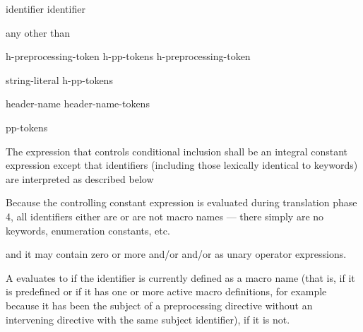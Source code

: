 %
\begin{bnf}
\br
     identifier\br
     identifier \terminal{)}
\end{bnf}

\begin{bnf}
\br
    \textnormal{any  other than \terminal{>}}
\end{bnf}

\begin{bnf}
\br
    h-preprocessing-token\br
    h-pp-tokens h-preprocessing-token
\end{bnf}

\begin{bnf}
\br
    string-literal\br
    \terminal{<} h-pp-tokens \terminal{>}
\end{bnf}

%
\begin{bnf}
\br
     \terminal{(} header-name \terminal{)}\br
     \terminal{(} header-name-tokens \terminal{)}
\end{bnf}

%
\begin{bnf}
\br
     pp-tokens \terminal{)}
\end{bnf}

\pnum
The expression that controls conditional inclusion
shall be an integral constant expression except that
identifiers
(including those lexically identical to keywords)
are interpreted as described below
\begin{footnote}
Because the controlling constant expression is evaluated
during translation phase 4,
all identifiers either are or are not macro names ---
there simply are no keywords, enumeration constants, etc.
\end{footnote}
and it may contain zero or more  and/or
 and/or
 as unary operator expressions.

\pnum
A  evaluates to 
if the identifier is currently defined
as a macro name
(that is, if it is predefined
or if it has one or more active macro definitions,
for example because
it has been the subject of a
preprocessing directive
without an intervening
directive with the same subject identifier),  if it is not.


